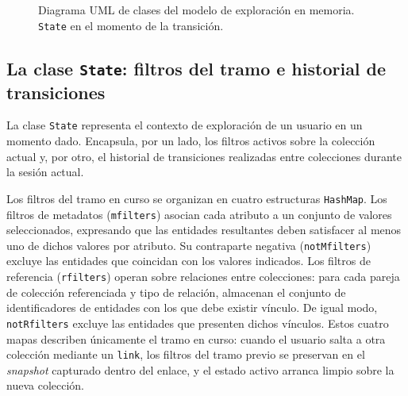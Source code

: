 \begin{figure}[H]
  \caption[Diagrama UML del modelo de exploración]{Diagrama UML de clases del modelo de exploración en memoria.
  \texttt{State} en el momento de la transición.}
  \label{fig:umlClases}
\end{figure}

    \subsection{La clase \texttt{State}: filtros del tramo e historial de transiciones}

La clase \texttt{State} representa el contexto de exploración de un usuario en un momento dado.
Encapsula, por un lado, los filtros activos sobre la colección actual y, por otro, el historial
de transiciones realizadas entre colecciones durante la sesión actual.

Los filtros del tramo en curso se organizan en cuatro estructuras \texttt{HashMap}. Los filtros de
metadatos (\texttt{mfilters}) asocian cada atributo a un conjunto de valores seleccionados,
expresando que las entidades resultantes deben satisfacer al menos uno de dichos valores por
atributo. Su contraparte negativa (\texttt{notMfilters}) excluye las entidades que coincidan con los
valores indicados. Los filtros de referencia (\texttt{rfilters}) operan sobre relaciones entre
colecciones: para cada pareja de colección referenciada y tipo de relación, almacenan el conjunto de
identificadores de entidades con los que debe existir vínculo. De igual modo, \texttt{notRfilters}
excluye las entidades que presenten dichos vínculos. Estos cuatro mapas describen únicamente el
tramo en curso: cuando el usuario salta a otra colección mediante un \texttt{link}, los filtros del
tramo previo se preservan en el \textit{snapshot} capturado dentro del enlace, y el estado activo arranca
limpio sobre la nueva colección.


